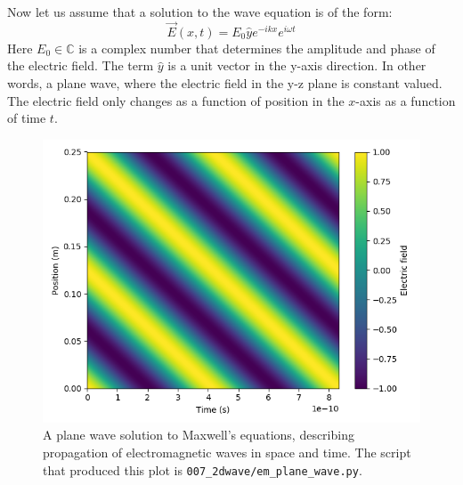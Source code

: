 Now let us assume that a solution to the wave equation is of the form:
\begin{equation}
\vec{E}(x,t)= E_0 \hat{y} e^{-i k x}e^{i\omega t}
\label{efieldplanewave}
\end{equation}
Here $E_0 \in \mathbb{C}$ is a complex number that determines the amplitude and phase of the electric field. The term $\hat{y}$ is a unit vector in the y-axis direction. In other words, a plane wave, where the electric field in the y-z plane is constant valued. The electric field only changes as a function of position in the $x$-axis as a function of time $t$.

\begin{figure}
\begin{center}
\includegraphics[width=\textwidth]{ch06/figures/em_plane_wave.png}
\end{center}
\caption{A plane wave solution to Maxwell's equations, describing propagation of electromagnetic waves in space and time. The script that produced this plot is \texttt{007\_2dwave/em\_plane\_wave.py}. }
\label{fig:planewave}
\end{figure}

